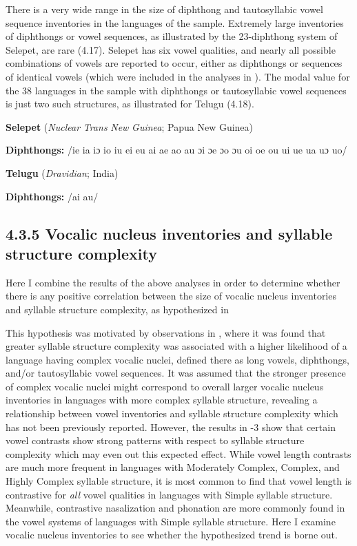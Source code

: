   There is a very wide range in the size of diphthong and tautosyllabic vowel sequence inventories in the languages of the sample. Extremely large inventories of diphthongs or vowel sequences, as illustrated by the 23-diphthong system of Selepet, are rare (4.17). Selepet has six vowel qualities, and nearly all possible combinations of vowels are reported to occur, either as diphthongs or sequences of identical vowels (which were included in the analyses in ). The modal value for the 38 languages in the sample with diphthongs or tautosyllabic vowel sequences is just two such structures, as illustrated for Telugu (4.18).

\ea\label{ex:(4.17)}
   \textbf{Selepet} (\textit{Nuclear} \textit{Trans} \textit{New} \textit{Guinea}; Papua New Guinea)

\textbf{Diphthongs:} /ie ia iɔ io iu ei eu ai ae ao au ɔi ɔe ɔo ɔu oi oe ou ui ue ua uɔ uo/
\z

\ea\label{ex:(4.18)}
  \textbf{Telugu} (\textit{Dravidian}; India)

\textbf{Diphthongs:} /ai au/
\z

\subsection{4.3.5 Vocalic nucleus inventories and syllable structure complexity}

  Here I combine the results of the above analyses in order to determine whether there is any positive correlation between the size of vocalic nucleus inventories and syllable structure complexity, as hypothesized in 

  This hypothesis was motivated by observations in , where it was found that greater syllable structure complexity was associated with a higher likelihood of a language having complex vocalic nuclei, defined there as long vowels, diphthongs, and/or tautosyllabic vowel sequences. It was assumed that the stronger presence of complex vocalic nuclei might correspond to overall larger vocalic nucleus inventories in languages with more complex syllable structure, revealing a relationship between vowel inventories and syllable structure complexity which has not been previously reported. However, the results in -3 show that certain vowel contrasts show strong patterns with respect to syllable structure complexity which may even out this expected effect. While vowel length contrasts are much more frequent in languages with Moderately Complex, Complex, and Highly Complex syllable structure, it is most common to find that vowel length is contrastive for \textit{all} vowel qualities in languages with Simple syllable structure. Meanwhile, contrastive nasalization and phonation are more commonly found in the vowel systems of languages with Simple syllable structure. Here I examine vocalic nucleus inventories to see whether the hypothesized trend is borne out.

